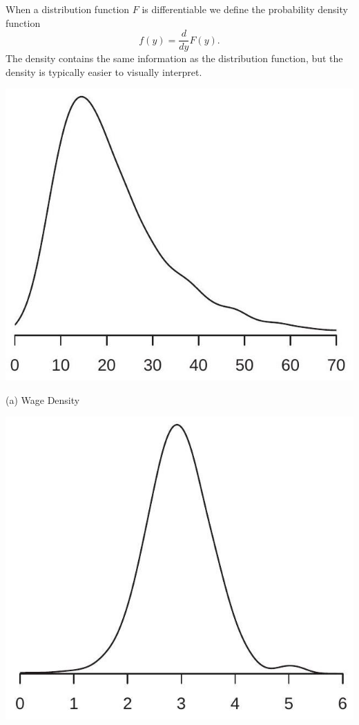 \documentclass[10pt]{article}
\begin{document}
When a distribution function $F$ is differentiable we define the probability density function
$$
f(y)=\frac{d}{d y} F(y) .
$$
The density contains the same information as the distribution function, but the density is typically easier to visually interpret.

\includegraphics[max width=\textwidth]{2022_09_17_efa0deee3441d06e0b66g-02}

(a) Wage Density

\includegraphics[max width=\textwidth]{2022_09_17_efa0deee3441d06e0b66g-02(1)}
\end{document}
